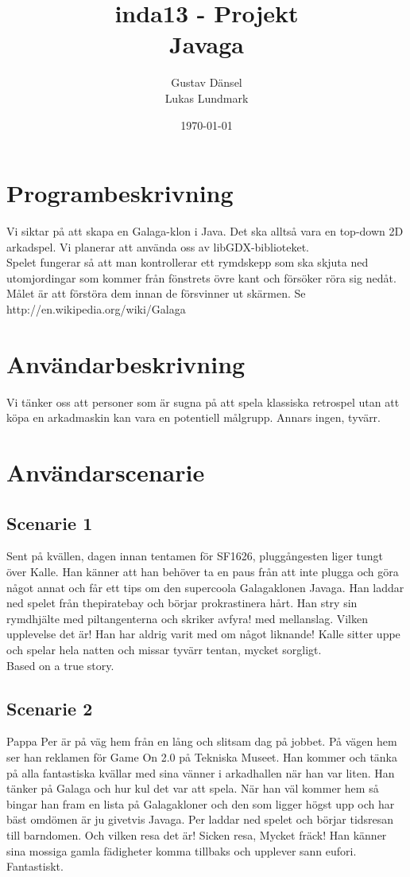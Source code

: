 \documentclass[a4paper,11pt]{article}
\title{inda13 - Projekt \\
		Javaga}
\author{Gustav Dänsel \\ Lukas Lundmark }
\date{\today}
\begin{document}
\maketitle
\section{Programbeskrivning}
Vi siktar på att skapa en Galaga-klon i Java. Det ska alltså vara en top-down 2D arkadspel. Vi planerar att använda oss av libGDX-biblioteket. \\

Spelet fungerar så att man kontrollerar ett rymdskepp som ska skjuta ned utomjordingar som kommer från fönstrets övre kant och försöker röra sig nedåt. Målet är att förstöra dem innan de försvinner ut skärmen. Se http://en.wikipedia.org/wiki/Galaga

\section{Användarbeskrivning}
Vi tänker oss att personer som är sugna på att spela klassiska retrospel utan att köpa en arkadmaskin kan vara en potentiell målgrupp. Annars ingen, tyvärr.

\section{Användarscenarie}
\subsection{Scenarie 1}
Sent på kvällen, dagen innan tentamen för SF1626, pluggångesten liger tungt över Kalle. Han känner att han behöver ta en paus från att inte plugga och göra något annat och får ett tips om den supercoola Galagaklonen Javaga. Han laddar ned spelet från thepiratebay och börjar prokrastinera hårt. Han stry sin rymdhjälte med piltangenterna och skriker avfyra! med mellanslag. Vilken upplevelse det är! Han har aldrig varit med om något liknande! Kalle sitter uppe och spelar hela natten och missar tyvärr tentan, mycket sorgligt. \\

\noindent
Based on a true story.

\subsection{Scenarie 2}
Pappa Per är på väg hem från en lång och slitsam dag på jobbet. På vägen hem ser han reklamen för Game On 2.0 på Tekniska Museet. Han kommer och tänka på alla fantastiska kvällar med sina vänner i arkadhallen när han var liten. Han tänker på Galaga och hur kul det var att spela. När han väl kommer hem så bingar han fram en lista på Galagakloner och den som ligger högst upp och har bäst omdömen är ju givetvis Javaga. Per laddar ned spelet och börjar tidsresan till barndomen. Och vilken resa det är! Sicken resa, Mycket fräck! Han känner sina mossiga gamla fädigheter komma tillbaks och upplever sann eufori. Fantastiskt.
\end{document}

